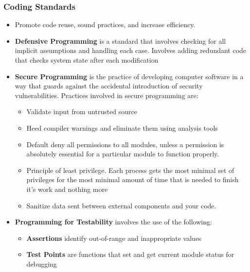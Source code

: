 \documentclass{article}
\begin{document}
\subsubsection{Coding Standards}
\begin{itemize}
    \item Promote code reuse, sound practices, and increase efficiency.
    
    \item \textbf{Defensive Programming} is a standard that involves checking for all implicit assumptions and handling each case. Involves adding redundant code that checks system state after each modification 
    
    \item \textbf{Secure Programming} is the practice of developing computer software in a way that guards against the accidental introduction of security vulnerabilities. Practices involved in secure programming are:
    \begin{itemize}
        \item Validate input from untrusted source
        
        \item Heed compiler warnings and eliminate them using analysis tools
        
        \item Default deny all permissions to all modules, unless a permission is absolutely essential for a particular module to function properly. 
        
        \item Principle of least privilege. Each process gets the most minimal set of privileges for the most minimal amount of time that is needed to finish it's work and nothing more
        
        \item Sanitize data sent between external components and your code. 
    \end{itemize}
    
    \item \textbf{Programming for Testability} involves the use of the following:
    \begin{itemize}
        \item \textbf{Assertions} identify out-of-range and inappropriate values
        
        \item \textbf{Test Points} are functions that set and get current module status for debugging
        

\end{itemize}
\end{itemize}
\end{document}
